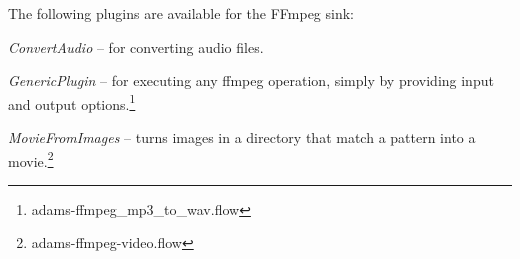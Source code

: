 \documentclass[a4paper]{book}
\begin{document}
\noindent The following plugins are available for the FFmpeg sink:
\begin{tight_itemize}
  \item \textit{ConvertAudio} -- for converting audio files.
  \item \textit{GenericPlugin} -- for executing any ffmpeg operation, simply
  by providing input and output options.\footnote{adams-ffmpeg_mp3\_to\_wav.flow}
  \item \textit{MovieFromImages} -- turns images in a directory that match a
  pattern into a movie.\footnote{adams-ffmpeg-video.flow}
\end{tight_itemize}



\end{document}
